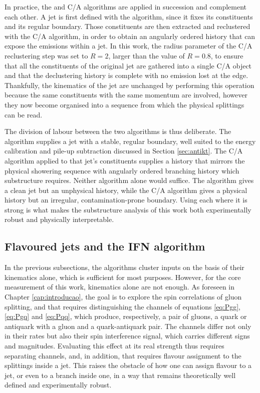 In practice, the \antikt{} and C/A algorithms are applied in succession and complement each other.
A jet is first defined with the \antikt{} algorithm, since it fixes its constituents and
its regular boundary. Those constituents are then extracted and reclustered with the C/A algorithm,
in order to obtain an angularly ordered history that can expose the emissions within a jet.
In this work, the radius parameter of the C/A reclustering step was set to $R=2$, larger than the
\antikt{} value of $R=0.8$, to ensure that all the constituents of the original jet
are gathered into a single C/A object and that the declustering history is complete
with no emission lost at the edge. Thankfully, the kinematics of the jet are unchanged
by performing this operation because the same constituents with the same momentum are 
involved, however they now become organised into a sequence from which the physical
splittings can be read.

The division of labour between the two algorithms is thus deliberate. The
\antikt{} algorithm supplies a jet with a stable, regular boundary, well suited to
the energy calibration and pile-up subtraction discussed in
Section \ref{sec:antikt}. The C/A algorithm applied to that jet's constituents
supplies a history that mirrors the physical showering sequence with angularly ordered
branching history which substructure requires. Neither algorithm alone would suffice.
The \antikt{} algorithm gives a clean jet but an unphysical history, while the
C/A algorithm gives a physical history but an irregular, contamination-prone boundary.
Using each where it is strong is what makes the substructure analysis of this work both
experimentally robust and physically interpretable.

\subsection{Flavoured jets and the IFN algorithm}
\label{sec:ifn}

In the previous subsections, the algorithms cluster inputs on the basis of their
kinematics alone, which is sufficient for most purposes. However, for the core measurement
of this work, kinematics alone are not enough. As foreseen in Chapter \ref{cap:introducao},
the goal is to explore the spin correlations of gluon splitting, and that requires
distinguishing the channels of equations \eqref{eq:Pgg}, \eqref{eq:Pgq} and \eqref{eq:Pqq},
which produce, respectively, a pair of gluons, a quark or antiquark with a gluon and a quark-antiquark pair.
The channels differ not only in their rates but also their spin interference signal, which carries
different signs and magnitudes. Evaluating this effect at its real strength thus requires
separating channels, and, in addition, that requires flavour assignment to the splittings
inside a jet. This raises the obstacle of how one can assign flavour to a jet, or even
to a branch inside one, in a way that remains theoretically well defined and experimentally robust.

